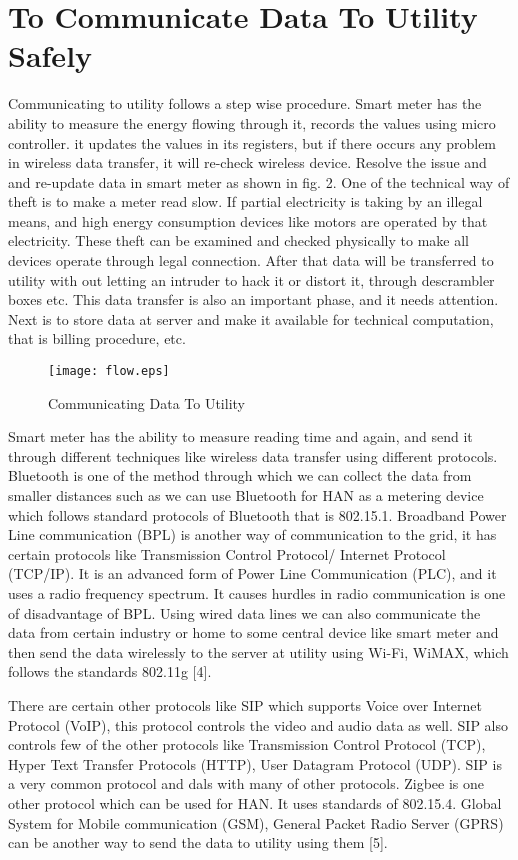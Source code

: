 \documentclass[10pt, conference, compsocconf]{IEEEtran}
\begin{document}
\section{To Communicate Data To Utility Safely}

Communicating to utility follows a step wise procedure. Smart meter has the ability to measure the energy flowing through it, records the values using micro controller. it updates the values in its registers, but if there occurs any problem in wireless data transfer, it will re-check wireless device. Resolve the issue and and re-update data in smart meter as shown in fig. 2. One of the technical way of theft is to make a meter read slow. If partial electricity is taking by an illegal means, and high energy consumption devices like motors are operated by that electricity. These theft can be examined and checked physically to make all devices operate through legal connection. After that data will be transferred to utility with out letting an intruder to hack it or distort it, through descrambler boxes etc. This data transfer is also an important phase, and it needs attention. Next is to store data at server and make it available for technical computation, that is billing procedure, etc.

\begin{figure}{}
\centering
\texttt{[image: flow.eps]}
\caption{Communicating Data To Utility}
\end{figure}

Smart meter has the ability to measure reading time and again, and send it through different techniques like wireless data transfer using different protocols. Bluetooth is one of the method through which we can collect the data from smaller distances such as we can use Bluetooth for HAN as a metering device which follows standard protocols of Bluetooth that is 802.15.1. Broadband Power Line communication (BPL) is another way of communication to the grid, it has certain protocols like Transmission Control Protocol/ Internet Protocol (TCP/IP). It is an advanced form of Power Line Communication (PLC), and it uses a radio frequency spectrum. It causes hurdles in radio communication is one of disadvantage of BPL. Using wired data lines we can also communicate the data from certain industry or home to some central device like smart meter and then send the data wirelessly to the server at utility using Wi-Fi, WiMAX, which follows the standards 802.11g [4].

There are certain other protocols like SIP which supports Voice over Internet Protocol (VoIP), this protocol controls the video and audio data as well. SIP also controls few of the other protocols like Transmission Control Protocol (TCP), Hyper Text Transfer Protocols (HTTP), User Datagram Protocol (UDP). SIP is a very common protocol and dals with many of other protocols. Zigbee is one other protocol which can be used for HAN. It uses standards of 802.15.4. Global System for Mobile communication (GSM), General Packet Radio Server (GPRS) can be another way to send the data to utility using them [5].
\end{document}
